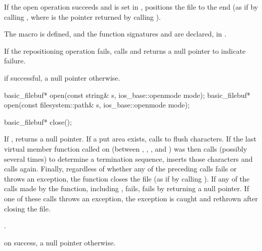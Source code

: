 \begin{itemdescr}
\pnum
If the open operation succeeds and
 is set in ,
positions the file to the end
(as if by calling , where
 is the pointer returned by calling ).
\begin{footnote}
The macro 
is defined, and the function signatures
%
and
%
are declared, in .
\end{footnote}

\pnum
If the repositioning operation fails, calls
and returns a null pointer to indicate failure.

\pnum
\returns
{}
if successful, a null pointer otherwise.
\end{itemdescr}

%
\begin{itemdecl}
basic_filebuf* open(const string& s, ios_base::openmode mode);
basic_filebuf* open(const filesystem::path& s, ios_base::openmode mode);
\end{itemdecl}

\begin{itemdescr}
\pnum
\returns
{}
\end{itemdescr}

%
\begin{itemdecl}
basic_filebuf* close();
\end{itemdecl}

\begin{itemdescr}
\pnum
\effects
If
,
returns a null pointer.
If a put area exists, calls
to flush characters.
If the last virtual member function called on
(between
,
,
,
and
)
was
then calls
(possibly several times) to determine a termination sequence, inserts those
characters and calls
again.
Finally, regardless of whether any of the preceding calls fails or throws an
exception, the function closes the file
(as if by calling
%
).
If any of the calls made by the function, including , fails,
 fails by returning a null pointer. If one of these calls throws an
exception, the exception is caught and rethrown after closing the file.

\pnum
\ensures
{}.

\pnum
\returns
{}
on success, a null pointer otherwise.
\end{itemdescr}

